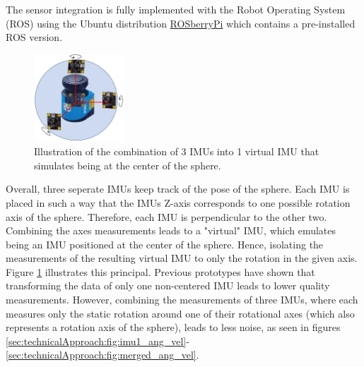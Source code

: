 The sensor integration is fully implemented with the Robot Operating System (ROS) using the Ubuntu distribution \href{http://wiki.ros.org/ROSberryPi}{ROSberryPi} which contains a pre-installed ROS version.
\begin{figure} 
\centering
\includegraphics[width=0.3\textwidth]{../Media/virtualIMU.png}                                                                                                                                                      
\caption{Illustration of the combination of 3 IMUs into 1 virtual IMU that simulates being at the center of the sphere.}                                                                                                                           
\label{sec:SensorIntegration:fig:virtual}                                                                                                                                                                       
\end{figure}                                                                                                                                                                                                      
Overall, three seperate IMUs keep track of the pose of the sphere. Each IMU is placed in such a way that the IMUs Z-axis corresponds to one possible rotation axis of the sphere.
Therefore, each IMU is perpendicular to the other two.
Combining the axes measurements leads to a "virtual" IMU, which emulates being an IMU positioned at the center of the sphere. 
Hence, isolating the measurements of the resulting virtual IMU to only the rotation in the given axis.
Figure \ref{sec:SensorIntegration:fig:virtual} illustrates this principal.
Previous prototypes have shown that transforming the data of only one non-centered IMU leads to lower quality measurements.
However, combining the measurements of three IMUs, where each measures only the static rotation around one of their rotational axes (which also represents a rotation axis of the sphere), leads to less noise, as seen in figures  \ref{sec:technicalApproach:fig:imu1_ang_vel}-\ref{sec:technicalApproach:fig:merged_ang_vel}.

